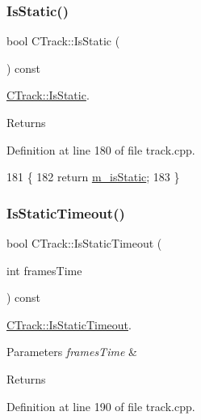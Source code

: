 \subsubsection{\texorpdfstring{Is\+Static()}{IsStatic()}}
{\footnotesize\ttfamily bool C\+Track\+::\+Is\+Static (\begin{DoxyParamCaption}{ }\end{DoxyParamCaption}) const}



\mbox{\hyperlink{class_c_track_a4f3265c10e4ad24b8b7b10668edfa309}{C\+Track\+::\+Is\+Static}}. 

\begin{DoxyReturn}{Returns}

\end{DoxyReturn}


Definition at line 180 of file track.\+cpp.


\begin{DoxyCode}
181 \{
182     \textcolor{keywordflow}{return} \mbox{\hyperlink{class_c_track_a37f858466a4c5de19eea18ab829e4745}{m\_isStatic}};
183 \}
\end{DoxyCode}
\mbox{\label{class_c_track_a815097c7b43655fcd5954d817493198c}} 
\subsubsection{\texorpdfstring{Is\+Static\+Timeout()}{IsStaticTimeout()}}
{\footnotesize\ttfamily bool C\+Track\+::\+Is\+Static\+Timeout (\begin{DoxyParamCaption}\item[{int}]{frames\+Time }\end{DoxyParamCaption}) const}



\mbox{\hyperlink{class_c_track_a815097c7b43655fcd5954d817493198c}{C\+Track\+::\+Is\+Static\+Timeout}}. 


\begin{DoxyParams}{Parameters}
{\em frames\+Time} & \\
\hline
\end{DoxyParams}
\begin{DoxyReturn}{Returns}

\end{DoxyReturn}


Definition at line 190 of file track.\+cpp.


